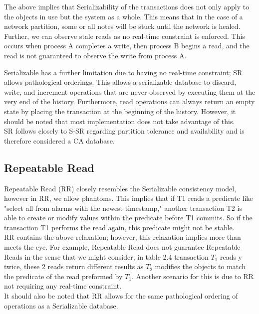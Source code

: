 \documentclass[a4paper,10pt,titlepage]{report}
\begin{document}
The above implies that Serializability of the transactions does not only apply to the objects in use but the system as a whole. This means that in the case of a network partition, some or all notes will be stuck until the network is healed. Further, we can observe stale reads as no real-time constraint is enforced. This occurs when process A completes a write, then process B begins a read, and the read is not guaranteed to observe the write from process A.
\\ \vspace{5mm}

Serializable has a further limitation due to having no real-time constraint; SR allows pathological orderings. This allows a serializable database to discard, write, and increment operations that are never observed by executing them at the very end of the history. Furthermore, read operations can always return an empty state by placing the transaction at the beginning of the history. However, it should be noted that most implementation does not take advantage of this.
\\ \vspace{5mm}
SR follows closely to S-SR regarding partition tolerance and availability and is therefore considered a CA database.
\\ \vspace{5mm}
\vspace{2mm}

\vspace{2mm}
\newpage
\subsection{Repeatable Read}

Repeatable Read (RR) closely resembles the Serializable consistency model, however in RR, we allow phantoms. This implies that if T1 reads a predicate like "select all from alarms with the newest timestamp," another transaction T2 is able to create or modify values within the predicate before T1 commits. So if the transaction T1 performs the read again, this predicate might not be stable.
\\ \vspace{5mm}
RR contains the above relaxation; however, this relaxation implies more than meets the eye. For example, Repeatable Read does not guarantee Repeatable Reads in the sense that we might consider, in table 2.4 transaction $T_1$ reads y twice, these 2 reads return different results as $T_2$ modifies the objects to match the predicate of the read preformed by $T_1$. Another scenario for this is due to RR not requiring any real-time constraint.
\\ \vspace{5mm}
It should also be noted that RR allows for the same pathological ordering of operations as a Serializable database.
\vspace{2mm}

\vspace{2mm}
\end{document}
